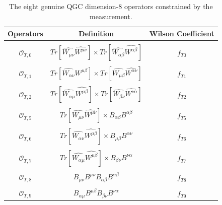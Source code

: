 \begin{table}[!htbp]
    \caption{The eight genuine QGC dimension-8 operators constrained by the measurement. \label{tab:Dim8Operators}}
    \begin{center}
    \begin{tabular}{| c | c | c | }
        \hline 
        Operators & Definition & Wilson Coefficient \\
        \hline
         & & \\
        $\mathcal{O}_{T,0}$ & $Tr[ \hat{W_{\mu\nu}} \hat{W^{\mu\nu}}] \times Tr[\hat{W_{\alpha \beta}} \hat{W^{\alpha \beta}} ] $ & $f_{T0}$ \\
         & & \\
        $\mathcal{O}_{T,1}$ & $Tr[ \hat{W_{\alpha\nu}} W^{\mu\beta}] \times Tr[ \hat{ W_{\mu \beta}}\hat {W^{\alpha \nu}} ] $ & $f_{T1}$ \\
         & & \\
        $\mathcal{O}_{T,2}$ & $Tr[ \hat{W_{\alpha\mu}} \hat{W^{\mu\beta} }] \times Tr[\hat{W_{\beta\nu}} \hat{W^{\nu\alpha} }] $ & $f_{T2}$ \\
         & & \\
        $\mathcal{O}_{T,5}$ & $Tr[ \hat{W_{\mu\nu}} \hat{W^{\mu\nu} } ] \times B_{\alpha\beta}B^{\alpha\beta} $ & $f_{T5}$ \\
         & & \\
        $\mathcal{O}_{T,6}$ & $Tr[ \hat{W_{\alpha\nu}} \hat{W^{\mu\beta} } ] \times B_{\mu\beta}B^{\alpha\nu} $ & $f_{T6}$ \\
         & & \\
        $\mathcal{O}_{T,7}$ & $Tr[ \hat{W_{\alpha\mu}} \hat{W^{\mu\beta} }] \times  B_{\beta\nu}B^{\nu\alpha} $ & $f_{T7}$ \\
         & & \\
        $\mathcal{O}_{T,8}$ & $ B_{\mu\nu}B^{\mu\nu}B_{\alpha\beta}B^{\alpha\beta} $ & $f_{T8}$ \\
         & & \\
        $\mathcal{O}_{T,9}$ & $ B_{\alpha\mu}B^{\mu\beta} B_{\beta\nu}B^{\nu\alpha}$ & $f_{T9}$ \\
        \hline 
    \end{tabular}
    \end{center}
\end{table}    

